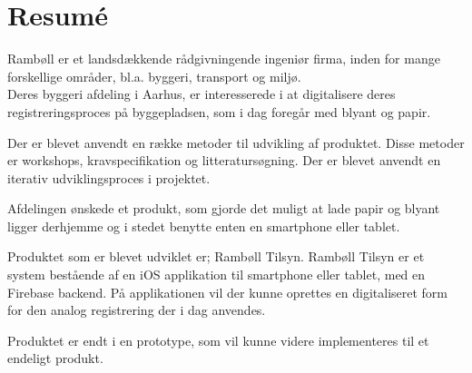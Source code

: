 \chapter*{Resumé}
Rambøll er et landsdækkende rådgivningende ingeniør firma, inden for mange forskellige områder, bl.a. byggeri, transport og miljø. \\
Deres byggeri afdeling i Aarhus, er interesserede i at digitalisere deres registreringsproces på byggepladsen, som i dag foregår med blyant og papir.

Der er blevet anvendt en række metoder til udvikling af produktet. Disse metoder er workshops, kravspecifikation og litteratursøgning. Der er blevet anvendt en iterativ udviklingsproces i projektet.

Afdelingen ønskede et produkt, som gjorde det muligt at lade papir og blyant ligger derhjemme og i stedet benytte enten en smartphone eller tablet.

Produktet som er blevet udviklet er; Rambøll Tilsyn. Rambøll Tilsyn er et system bestående af en iOS applikation til smartphone eller tablet, med en Firebase backend.
På applikationen vil der kunne oprettes en digitaliseret form for den analog registrering der i dag anvendes. 

Produktet er endt i en prototype, som vil kunne videre implementeres til et endeligt produkt.

\clearpage
